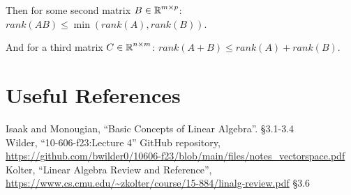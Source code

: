 Then for some second matrix $B\in\operatorname{\mathbb{R}}^{m\times p}$: $rank(AB) \le \min(rank(A),rank(B))$. 

And for a third matrix $C\in\operatorname{\mathbb{R}}^{n\times m}$: $rank(A + B) \le rank(A) + rank(B).$


\section*{Useful References}
Isaak and Monougian, ``Basic Concepts of Linear Algebra''. \S 3.1-3.4\\
Wilder, ``10-606-f23:Lecture 4'' GitHub repository, \url{https://github.com/bwilder0/10606-f23/blob/main/files/notes_vectorspace.pdf}\\
Kolter, ``Linear Algebra Review and Reference'', \url{https://www.cs.cmu.edu/~zkolter/course/15-884/linalg-review.pdf} \S3.6



